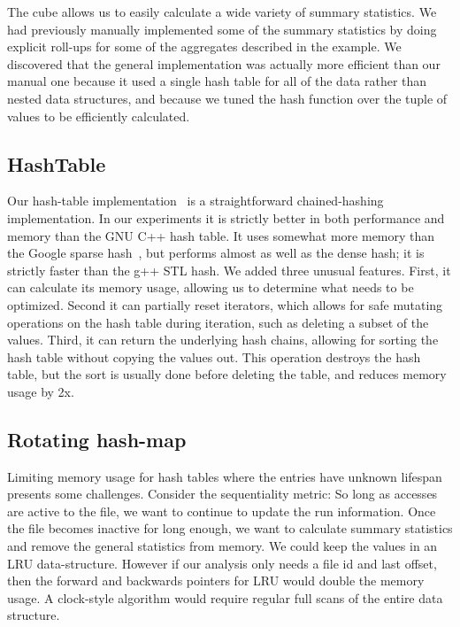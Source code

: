 The cube allows us to easily calculate a wide variety of summary
statistics.  We had previously manually implemented some of the
summary statistics by doing explicit roll-ups for some of the
aggregates described in the example.  We discovered that the general
implementation was actually more efficient than our manual one because
it used a single hash table for all of the data rather than nested
data structures, and because we tuned the hash function over the tuple
of values to be efficiently calculated.

\subsection{HashTable}

Our hash-table implementation~\cite{DSOpenSource} is a straightforward
chained-hashing implementation.  In our experiments it is strictly
better in both performance and memory than the GNU C++ hash table.  It
uses somewhat more memory than the Google sparse
hash~\cite{google-sparse-hash}, but performs almost as well as the
dense hash; it is strictly faster than the g++ STL hash.  We added
three unusual features.  First, it can calculate its memory usage,
allowing us to determine what needs to be optimized.  Second it can
partially reset iterators, which allows for safe mutating operations
on the hash table during iteration, such as deleting a subset of the
values.  Third, it can return the underlying hash chains, allowing for
sorting the hash table without copying the values out.  This operation destroys
the hash table, but the sort is usually done before deleting the
table, and reduces memory usage by 2x.

\subsection{Rotating hash-map}

Limiting memory usage for hash tables where the entries have unknown
lifespan presents some challenges. Consider the sequentiality metric:
So long as accesses are active to the file, we want to continue to
update the run information.  Once the file becomes inactive for long
enough, we want to calculate summary statistics and remove the general
statistics from memory.  We could keep the values in an LRU
data-structure.  However if our analysis only needs a file id and last
offset, then the forward and backwards pointers for LRU would double
the memory usage.  A clock-style algorithm would
require regular full scans of the entire data structure.

